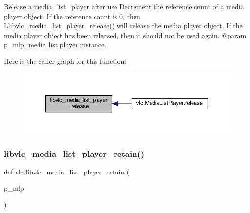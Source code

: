 \begin{DoxyVerb}Release a media_list_player after use
Decrement the reference count of a media player object. If the
reference count is 0, then L{libvlc_media_list_player_release}() will
release the media player object. If the media player object
has been released, then it should not be used again.
@param p_mlp: media list player instance.
\end{DoxyVerb}
 Here is the caller graph for this function\+:
\nopagebreak
\begin{figure}[H]
\begin{center}
\leavevmode
\includegraphics[width=350pt]{namespacevlc_a3763e35fa1176f0fafd4fe033738e96f_icgraph}
\end{center}
\end{figure}
\mbox{\label{namespacevlc_ac79a3046c80d6a0269c84975dd996085}} 
\subsubsection{\texorpdfstring{libvlc\+\_\+media\+\_\+list\+\_\+player\+\_\+retain()}{libvlc\_media\_list\_player\_retain()}}
{\footnotesize\ttfamily def vlc.\+libvlc\+\_\+media\+\_\+list\+\_\+player\+\_\+retain (\begin{DoxyParamCaption}\item[{}]{p\+\_\+mlp }\end{DoxyParamCaption})}

